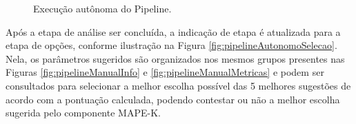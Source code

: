 \documentclass[portugues]{ic-tese}
\begin{document}
\begin{figure}[H]
    \centering
    \caption{Execução autônoma do Pipeline.}
    \label{fig:pipelineAutonomo}
\end{figure}

Após a etapa de análise ser concluída, a indicação de etapa é atualizada para a etapa de opções, conforme ilustração na Figura \ref{fig:pipelineAutonomoSelecao}. Nela, os parâmetros sugeridos são organizados nos mesmos grupos presentes nas Figuras \ref{fig:pipelineManualInfo} e \ref{fig:pipelineManualMetricas} e podem ser consultados para selecionar a melhor escolha possível das 5 melhores sugestões de acordo com a pontuação calculada, podendo contestar ou não a melhor escolha sugerida pelo componente MAPE-K.
\end{document}
